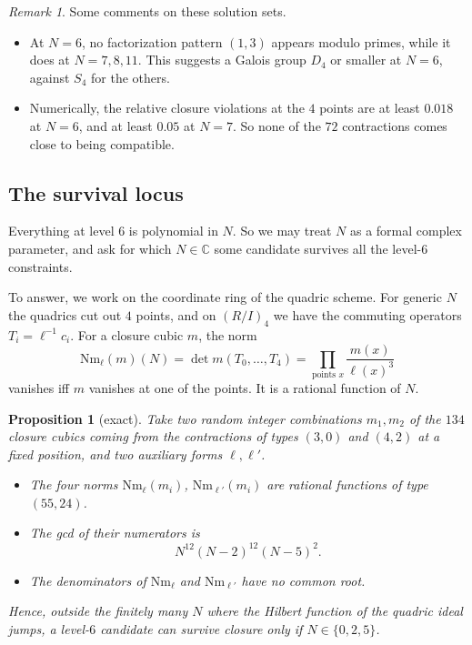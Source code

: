 \documentclass[11pt]{amsart}
\newtheorem{proposition}[theorem]{Proposition}
\theoremstyle{definition}
\theoremstyle{remark}
\newtheorem{remark}[theorem]{Remark}
\theoremstyle{plain}
\numberwithin{equation}{section}
\numberwithin{table}{section}
\newcommand{\C}{\mathbb C}
\begin{document}
\begin{remark}
Some comments on these solution sets.
\begin{itemize}
\item At $N=6$, no factorization pattern $(1,3)$ appears modulo primes, while it does at $N=7,8,11$. This suggests a Galois group $D_4$ or smaller at $N=6$, against $S_4$ for the others.
\item Numerically, the relative closure violations at the $4$ points are at least $0.018$ at $N=6$, and at least $0.05$ at $N=7$. So none of the $72$ contractions comes close to being compatible.
\end{itemize}
\end{remark}

\subsection{The survival locus}

Everything at level $6$ is polynomial in $N$. So we may treat $N$ as a formal complex parameter, and ask for which $N\in\C$ some candidate survives all the level-$6$ constraints.

To answer, we work on the coordinate ring of the quadric scheme. For generic $N$ the quadrics cut out $4$ points, and on $(R/I)_4$ we have the commuting operators $T_i=\ell^{-1}c_i$. For a closure cubic $m$, the norm
\[
\mathrm{Nm}_\ell(m)(N)=\det m(T_0,\dots,T_4)=\prod_{\text{points }x}\frac{m(x)}{\ell(x)^3}
\]
vanishes iff $m$ vanishes at one of the points. It is a rational function of $N$.

\begin{proposition}[exact]\label{prop:locus}
Take two random integer combinations $m_1,m_2$ of the $134$ closure cubics coming from the contractions of types $(3,0)$ and $(4,2)$ at a fixed position, and two auxiliary forms $\ell,\ell'$.
\begin{itemize}
\item The four norms $\mathrm{Nm}_\ell(m_i)$, $\mathrm{Nm}_{\ell'}(m_i)$ are rational functions of type $(55,24)$.
\item The gcd of their numerators is
\[
N^{12}(N-2)^{12}(N-5)^{2}.
\]
\item The denominators of $\mathrm{Nm}_\ell$ and $\mathrm{Nm}_{\ell'}$ have no common root.
\end{itemize}
Hence, outside the finitely many $N$ where the Hilbert function of the quadric ideal jumps, a level-$6$ candidate can survive closure only if $N\in\{0,2,5\}$.
\end{proposition}
\end{document}
